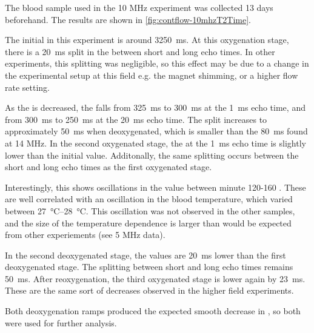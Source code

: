 The blood sample used in the 10 MHz experiment was collected 13 days beforehand.
The results are shown in \autoref{fig:contflow-10mhzT2Time}.

The initial \Ttwo in this experiment is around \SI{3250}{ms}.
At this oxygenation stage, there is a \SI{20}{ms} split in the \Ttwo between short and long echo times.
In other experiments, this splitting was negligible, so this effect may be due to a change in the experimental setup at this field e.g. the magnet shimming, or a higher flow rate setting.

As the \SOtwo is decreased, the \Ttwo falls from \SI{325}{ms} to \SI{300}{ms} at the \SI{1}{ms} echo time, and from \SI{300}{ms} to \SI{250}{ms} at the \SI{20}{ms} echo time.
The split increases to approximately \SI{50}{ms} when deoxygenated, which is smaller than the \SI{80}{ms} found at 14 MHz.
In the second oxygenated stage, the \Ttwo at the \SI{1}{ms} echo time is slightly lower than the initial value.
Additonally, the same splitting occurs between the short and long echo times as the first oxygenated stage.

Interestingly, this shows oscillations in the \Ttwo value between minute 120-160 .
These are well correlated with an oscillation in the blood temperature, which varied between \SIrange{27}{28}{\celsius}.
This oscillation was not observed in the other samples, and the size of the temperature dependence is larger than would be expected from other experiements (see 5 MHz data).

In the second deoxygenated stage, the \Ttwo values are \SI{20}{ms} lower than the first deoxygenated stage.
The splitting between short and long echo times remains \SI{50}{ms}.
After reoxygenation, the third oxygenated stage is lower again by \SI{23}{ms}.
These are the same sort of decreases observed in the higher field experiments.

Both deoxygenation ramps produced the expected smooth decrease in \Ttwo, so both were used for further analysis.


